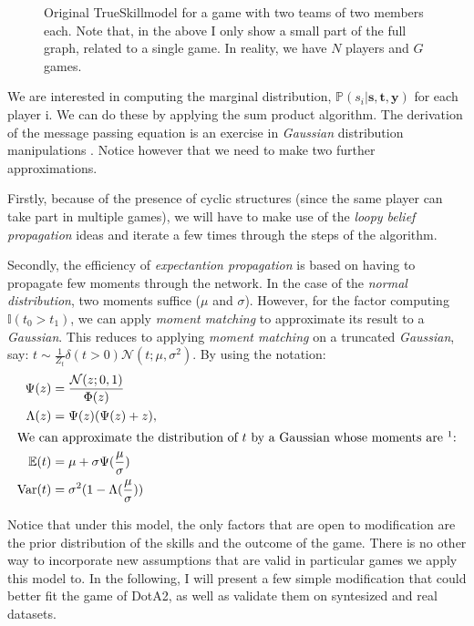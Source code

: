 \documentclass[10pt,a4]{article}
\begin{document}
\begin{figure}[ht]
	\begin{center}
	  	
	\end{center}
	\caption{Original TrueSkill\texttrademark  model for a game with two teams of
	two members each. Note that, in the above I only show a small part of the full graph, 
	related to a single game. In reality, we have $N$ players and $G$ games.
	}
	\label{fig:stdts}
\end{figure}

We are interested in computing the marginal distribution, 
$
\mathbb{P}(s_i | \mathbf{s}, \mathbf{t}, \mathbf{y})
$ for each player i. We can do these by applying the sum product algorithm. 
The derivation of the message passing equation is an exercise in \emph{Gaussian}
distribution manipulations \cite{herbrich2007trueskill}. 
Notice however that we need to make two further approximations. 

Firstly, because 
of the presence of cyclic structures (since the same player can take part in 
multiple games), we will have to make use of the \emph{loopy belief propagation}
ideas and iterate a few times through the steps of the algorithm. 

Secondly, the 
efficiency of \emph{expectantion propagation} is based on having to propagate few 
moments through the network. In the case of the \emph{normal distribution}, two moments
suffice ($\mu$ and $\sigma$). However, for the factor computing $\mathbb{I}(t_0 > t_1)$,
we can apply \emph{moment matching} to approximate its result to a \emph{Gaussian}. 
This reduces to applying \emph{moment matching} on a truncated \emph{Gaussian}, say:
$t \sim \frac{1}{Z_t}\delta (t > 0) \mathcal{N}(t; \mu ,\sigma ^2)$. By using the 
notation:
\begin{align*}
	\Psi(z) &= \frac{\mathcal{N}(z;0, 1)}{\Phi(z)} \\
	\Lambda(z) &= \Psi(z)(\Psi(z) + z), \\
\intertext{We can approximate the distribution of $t$ by a Gaussian whose moments 
are \footnotemark:} 
	\mathbb{E}(t) &= \mu + \sigma\Psi(\frac{\mu}{\sigma}) \\ 
	\text{Var}(t) &= \sigma ^ 2 (1 - \Lambda(\frac{\mu}{\sigma}))
\end{align*}

Notice that under this model, the only factors that are open to modification are  
the prior distribution of the skills and the outcome of the game. There is no other
way to incorporate new assumptions that are valid in particular games we apply
this model to.
In the following, I will present a few simple modification that could better
fit the game of DotA2, as well as validate them on syntesized and real datasets.
\end{document}
